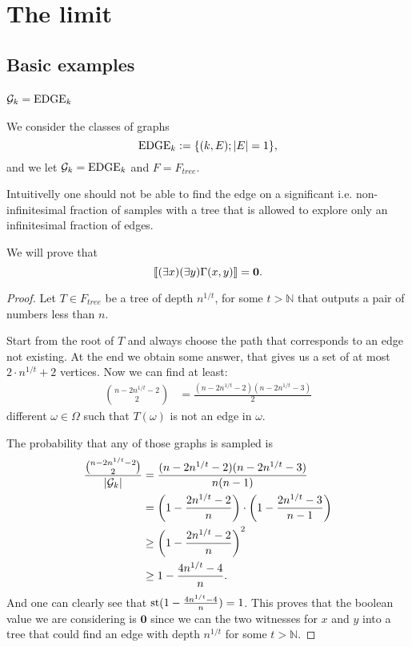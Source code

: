 \chapter{The limit}
\section{Basic examples}
\subsection{$\mathcal{G}_k=\text{EDGE}_k$}
We consider the classes of graphs
\[\text{EDGE}_k:=\{\text{$(k,E); \left|{E}\right|=1$}\},\]
and we let $\mathcal{G}_k=\text{EDGE}_k$ and $F=F_{tree}$.

Intuitivelly one should not be able to find the edge on a significant i.e. non-infinitesimal fraction of samples with a tree that is allowed to explore only an infinitesimal fraction of edges.

\begin{thrm}
We will prove that \[\llbracket(\exists x)(\exists y)\Gamma(x,y)\rrbracket=\textbf{0}.\]
\end{thrm}
\begin{proof}
Let $T\in F_{tree}$ be a tree of depth $n^{1/t}$, for some $t>\mathbb{N}$ that outputs a pair of numbers less than $n$.

Start from the root of $T$ and always choose the path that corresponds to an edge not existing. At the end we obtain some answer, that gives us a set of at most $2 \cdot n^{1/t}+2$ vertices. Now we can find at least: 
\begin{align}
\binom{n-2n^{1/t}-2}{2}&=\frac{(n-2n^{1/t}-2)(n-2n^{1/t}-3)}{2}
\end{align}
different $\omega\in\Omega$ such that $T(\omega)$ is not an edge in $\omega$. 

The probability that any of those graphs is sampled is
\begin{align}
\frac{\binom{n-2n^{1/t}-2}{2}}{\left|{\mathcal{G}_k}\right|}&=\frac{(n-2n^{1/t}-2)(n-2n^{1/t}-3)}{n(n-1)}\\
&=\left(1-\frac{2n^{1/t}-2}{n}\right)\cdot\left(1-\frac{2n^{1/t}-3}{n-1}\right)\\
&\geq \left(1-\frac{2n^{1/t}-2}{n}\right)^2\\
&\geq 1-\frac{4n^{1/t}-4}{n}.
\end{align}
And one can clearly see that $\text{st}(1-\frac{4n^{1/t}-4}{n})=1$. This proves that the boolean value we are considering is $\textbf{0}$ since we can the two witnesses for $x$ and $y$ into a tree that could find an edge with depth $n^{1/t}$ for some $t>\mathbb{N}$.
\end{proof}
